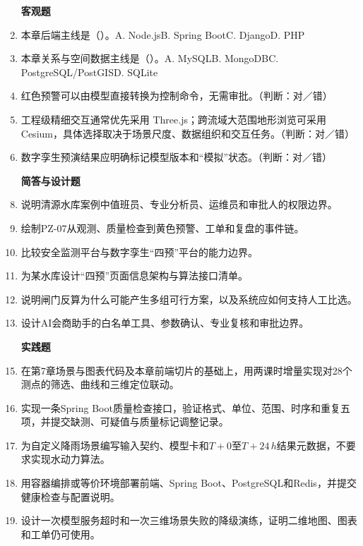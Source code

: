 \begin{enumerate}
\item[\textbf{客观题}]
\item 本章后端主线是（\quad）。A. Node.js\quad B. Spring Boot\quad C. Django\quad D. PHP
\item 本章关系与空间数据主线是（\quad）。A. MySQL\quad B. MongoDB\quad C. PostgreSQL/PostGIS\quad D. SQLite
\item 红色预警可以由模型直接转换为控制命令，无需审批。（判断：对／错）
\item 工程级精细交互通常优先采用 Three.js；跨流域大范围地形浏览可采用 Cesium，具体选择取决于场景尺度、数据组织和交互任务。（判断：对／错）
\item 数字孪生预演结果应明确标记模型版本和“模拟”状态。（判断：对／错）

\item[\textbf{简答与设计题}]
\item 说明清源水库案例中值班员、专业分析员、运维员和审批人的权限边界。
\item 绘制PZ-07从观测、质量检查到黄色预警、工单和复盘的事件链。
\item 比较安全监测平台与数字孪生“四预”平台的能力边界。
\item 为某水库设计“四预”页面信息架构与算法接口清单。
\item 说明闸门反算为什么可能产生多组可行方案，以及系统应如何支持人工比选。
\item 设计AI会商助手的白名单工具、参数确认、专业复核和审批边界。

\item[\textbf{实践题}]
\item 在第7章场景与图表代码及本章前端切片的基础上，用两课时增量实现对28个测点的筛选、曲线和三维定位联动。
\item 实现一条Spring Boot质量检查接口，验证格式、单位、范围、时序和重复五项，并提交缺测、可疑值与质量标记调整记录。
\item 为自定义降雨场景编写输入契约、模型卡和$T+0$至$T+24\,h$结果元数据，不要求实现水动力算法。
\item 用容器编排或等价环境部署前端、Spring Boot、PostgreSQL和Redis，并提交健康检查与配置说明。
\item 设计一次模型服务超时和一次三维场景失败的降级演练，证明二维地图、图表和工单仍可使用。
\end{enumerate}
